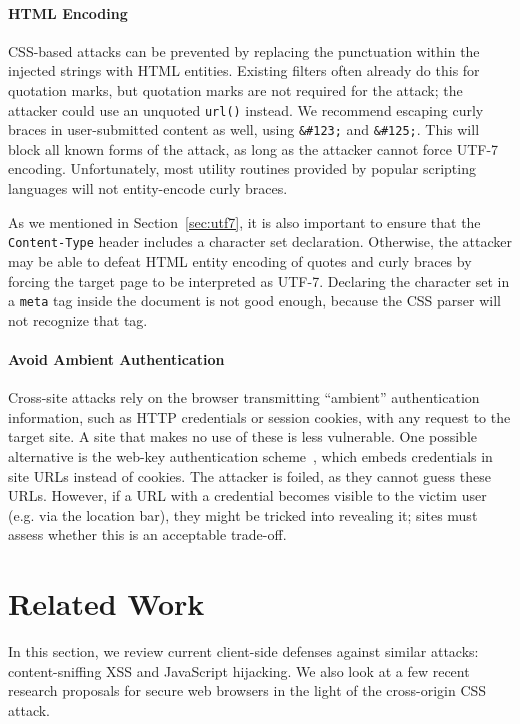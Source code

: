 \documentclass{acm_proc_article-sp}
\begin{document}
\paragraph{HTML Encoding}
CSS-based attacks can be prevented by replacing the punctuation
within the injected strings with HTML entities. Existing filters
often already do this for quotation marks, but quotation marks
are not required for the attack; the attacker could use an
unquoted \texttt{url()} instead. We recommend escaping curly
braces in user-submitted content as well, using \verb|&#123;|
and \verb|&#125;|. This will block all known forms of the
attack, as long as the attacker cannot force UTF-7 encoding.
Unfortunately, most utility routines provided by popular
scripting languages will not entity-encode curly braces.

As we mentioned in Section~\ref{sec:utf7}, it is also important
to ensure that the \texttt{Content-Type} header includes a
character set declaration. Otherwise, the attacker may be able
to defeat HTML entity encoding of quotes and curly braces by
forcing the target page to be interpreted as UTF-7. Declaring
the character set in a \texttt{meta} tag inside the document is
not good enough, because the CSS parser will not recognize that
tag.


\paragraph{Avoid Ambient Authentication}
Cross-site attacks rely on the browser transmitting “ambient”
authentication information, such as HTTP credentials or session
cookies, with any request to the target site.  A site that makes no
use of these is less vulnerable.  One possible alternative is the
web-key authentication scheme~\cite{webkey}, which embeds credentials
in site URLs instead of cookies.  The attacker is foiled, as they
cannot guess these URLs.  However, if a URL with a credential becomes
visible to the victim user (e.g. via the location bar), they might be
tricked into revealing it; sites must assess whether this is an
acceptable trade-off.

\section{Related Work} \label{sec:relatedwork}
In this section, we review current client-side defenses against
similar attacks: content-sniffing XSS and JavaScript hijacking.  We
also look at a few recent research proposals for secure web browsers
in the light of the cross-origin CSS attack.
\end{document}

